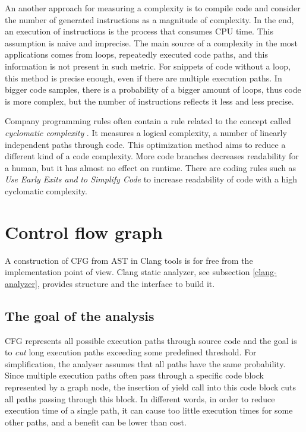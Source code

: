An another approach for measuring a complexity is to compile code and consider the number of generated instructions as a magnitude of complexity. In the end, an execution of instructions is the process that consumes CPU time. This assumption is naive and imprecise. The main source of a complexity in the most applications comes from loops, repeatedly executed code paths, and this information is not present in such metric. For snippets of code without a loop, this method is precise enough, even if there are multiple execution paths. In bigger code samples, there is a probability of a bigger amount of loops, thus code is more complex, but the number of instructions reflects it less and less precise.

Company programming rules often contain a rule related to the concept called \emph{cyclomatic complexity} \cite{cyclomatic-complexity}. It measures a logical complexity, a number of linearly independent paths through code. This optimization method aims to reduce a different kind of a code complexity. More code branches decreases readability for a human, but it has almost no effect on runtime. There are coding rules such as \emph{Use Early Exits and} \emph{} \emph{to Simplify Code} \cite{llvm-coding-standards} to increase readability of code with a high cyclomatic complexity.

\section{Control flow graph}
A construction of CFG from AST in Clang tools is for free from the implementation point of view. Clang static analyzer, see subsection \ref{clang-analyzer}, provides structure and the interface to build it.

\subsection{The goal of the analysis}
CFG represents all possible execution paths through source code and the goal is to \textit{cut} long execution paths exceeding some predefined threshold. For simplification, the analyser assumes that all paths have the same probability. Since multiple execution paths often pass through a specific code block represented by a graph node, the insertion of yield call into this code block cuts all paths passing through this block. In different words, in order to reduce execution time of a single path, it can cause too little execution times for some other paths, and a benefit can be lower than cost.

